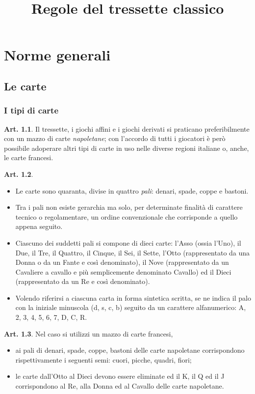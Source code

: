 \documentclass[italian,a4paper]{book}
\title{Regole del tressette classico}
\author{}
\date{}
\theoremstyle{definition}
\newtheorem{art}{Art.}
\newenvironment{packeditem}{
\begin{itemize}
  \setlength{\itemsep}{1pt}
  \setlength{\parskip}{0pt}
  \setlength{\parsep}{0pt}
}{\end{itemize}}
\begin{document}
\maketitle
\chapter{Norme generali}
\section{Le carte}
\subsection{I tipi di carte}
\begin{art}
    Il tressette, i giochi affini e i giochi derivati si praticano preferibilmente con un mazzo di carte \emph{napoletane}; con l'accordo di tutti i giocatori è però possibile adoperare altri tipi di carte in uso nelle diverse regioni italiane o, anche, le carte francesi.
\end{art}
\begin{art} \hspace*{\fill}
    \begin{packeditem}
    \item Le carte sono quaranta, divise in quattro \emph{pali}: denari, spade, coppe e bastoni.
\item Tra i pali non esiste gerarchia ma solo, per determinate finalità di carattere tecnico o regolamentare, un ordine convenzionale che corrisponde a quello appena seguito.
\item Ciascuno dei suddetti pali si compone di dieci carte: l'Asso (ossia l'Uno), il Due, il Tre, il Quattro, il Cinque, il Sei, il Sette, l'Otto (rappresentato da una Donna o da un Fante e così denominato), il Nove (rappresentato da un Cavaliere a cavallo e più semplicemente denominato Cavallo) ed il Dieci (rappresentato da un Re e così denominato).
\item Volendo riferirsi a ciascuna carta in forma sintetica scritta, se ne
    indica il palo con la iniziale minuscola (d, s, c, b) seguito da un carattere alfanumerico: A, 2,
    3, 4, 5, 6, 7, D, C, R.
    \end{packeditem}
\end{art}
\begin{art}
    Nel caso si utilizzi un mazzo di carte francesi,
    \begin{packeditem}
\item   ai pali di denari, spade, coppe, bastoni delle carte napoletane corrispondono rispettivamente i seguenti semi: cuori, picche, quadri, fiori;
\item   le carte dall'Otto al Dieci devono essere eliminate ed il K, il Q ed il J corrispondono al Re, alla Donna ed al Cavallo delle carte napoletane.
    \end{packeditem}
\end{art}
\end{document}

